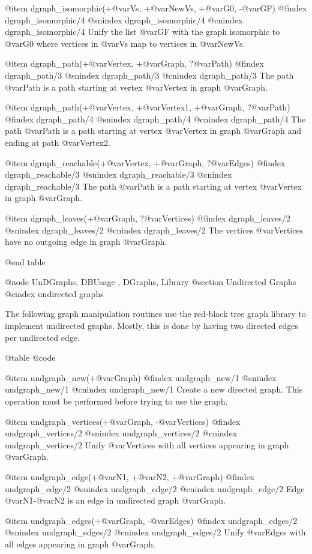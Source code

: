 @item dgraph_isomorphic(+@var{Vs}, +@var{NewVs}, +@var{G0}, -@var{GF})
@findex  dgraph_isomorphic/4
@snindex dgraph_isomorphic/4
@cnindex dgraph_isomorphic/4
Unify the list @var{GF} with the graph isomorphic to @var{G0} where 
vertices in @var{Vs} map to vertices in @var{NewVs}.

@item dgraph_path(+@var{Vertex}, +@var{Graph}, ?@var{Path})
@findex  dgraph_path/3
@snindex dgraph_path/3
@cnindex dgraph_path/3
The path @var{Path} is a path starting at vertex @var{Vertex} in graph
@var{Graph}.

@item dgraph_path(+@var{Vertex}, +@var{Vertex1}, +@var{Graph}, ?@var{Path})
@findex  dgraph_path/4
@snindex dgraph_path/4
@cnindex dgraph_path/4
The path @var{Path} is a path starting at vertex @var{Vertex} in graph
@var{Graph} and ending at path @var{Vertex2}.

@item dgraph_reachable(+@var{Vertex}, +@var{Graph}, ?@var{Edges})
@findex  dgraph_reachable/3
@snindex dgraph_reachable/3
@cnindex dgraph_reachable/3
The path @var{Path} is a path starting at vertex @var{Vertex} in graph
@var{Graph}.

@item dgraph_leaves(+@var{Graph}, ?@var{Vertices})
@findex  dgraph_leaves/2
@snindex dgraph_leaves/2
@cnindex dgraph_leaves/2
The vertices @var{Vertices} have no outgoing edge in graph
@var{Graph}.

@end table

@node UnDGraphs, DBUsage , DGraphs, Library
@section Undirected Graphs
@cindex undirected graphs

The following graph manipulation routines use the red-black tree graph
library to implement undirected graphs. Mostly, this is done by having
two directed edges per undirected edge.

@table @code

@item undgraph_new(+@var{Graph})
@findex  undgraph_new/1
@snindex undgraph_new/1
@cnindex undgraph_new/1
Create a new directed graph. This operation must be performed before
trying to use the graph.

@item undgraph_vertices(+@var{Graph}, -@var{Vertices})
@findex  undgraph_vertices/2
@snindex undgraph_vertices/2
@cnindex undgraph_vertices/2
Unify @var{Vertices} with all vertices appearing in graph
@var{Graph}.

@item undgraph_edge(+@var{N1}, +@var{N2}, +@var{Graph})
@findex  undgraph_edge/2
@snindex undgraph_edge/2
@cnindex undgraph_edge/2
Edge @var{N1}-@var{N2} is an edge in undirected graph @var{Graph}.

@item undgraph_edges(+@var{Graph}, -@var{Edges})
@findex  undgraph_edges/2
@snindex undgraph_edges/2
@cnindex undgraph_edges/2
Unify @var{Edges} with all edges appearing in graph
@var{Graph}.

